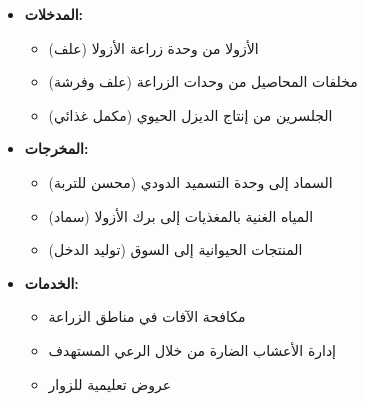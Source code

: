 \begin{itemize}
    \item \textbf{المدخلات:}
    \begin{itemize}
        \item الأزولا من وحدة زراعة الأزولا (علف)
        \item مخلفات المحاصيل من وحدات الزراعة (علف وفرشة)
        \item الجلسرين من إنتاج الديزل الحيوي (مكمل غذائي)
    \end{itemize}
    
    \item \textbf{المخرجات:}
    \begin{itemize}
        \item السماد إلى وحدة التسميد الدودي (محسن للتربة)
        \item المياه الغنية بالمغذيات إلى برك الأزولا (سماد)
        \item المنتجات الحيوانية إلى السوق (توليد الدخل)
    \end{itemize}
    
    \item \textbf{الخدمات:}
    \begin{itemize}
        \item مكافحة الآفات في مناطق الزراعة
        \item إدارة الأعشاب الضارة من خلال الرعي المستهدف
        \item عروض تعليمية للزوار
    \end{itemize}
\end{itemize}


